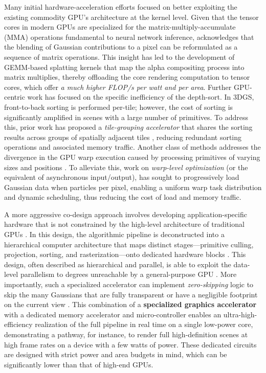 \documentclass[11pt,a4paper]{article}
\begin{document}
Many initial hardware-acceleration efforts focused on better exploiting the existing commodity GPU's architecture at the kernel level. Given that the tensor cores in modern GPUs are specialized for the matrix-multiply-accumulate (MMA) operations fundamental to neural network inference, \cite{arxiv:2308.04079v1} acknowledges that the blending of Gaussian contributions to a pixel can be reformulated as a sequence of matrix operations. This insight has led to the development of GEMM-based splatting kernels that map the alpha compositing process into matrix multiplies, thereby offloading the core rendering computation to tensor cores, which offer \emph{a much higher FLOP/s per watt and per area}. Further GPU-centric work has focused on the specific inefficiency of the depth-sort. In 3DGS, front-to-back sorting is performed per-tile; however, the cost of sorting is significantly amplified in scenes with a large number of primitives. To address this, prior work has proposed a \emph{tile-grouping accelerator} that shares the sorting results across groups of spatially adjacent tiles \cite{arxiv:2308.04079v1}, reducing redundant sorting operations and associated memory traffic. Another class of methods addresses the divergence in the GPU warp execution caused by processing primitives of varying sizes and positions \cite{arxiv:2401.03890v2}. To alleviate this, work on \emph{warp-level optimization} (or the equivalent of asynchronous input/output), has sought to progressively load Gaussian data when particles per pixel, enabling a uniform warp task distribution and dynamic scheduling, thus reducing the cost of load and memory traffic.

A more aggressive co-design approach involves developing application-specific hardware that is not constrained by the high-level architecture of traditional GPUs \cite{arxiv:2401.03890v2}. In this design, the algorithmic pipeline is deconstructed into a hierarchical computer architecture that maps distinct stages---primitive culling, projection, sorting, and rasterization---onto dedicated hardware blocks \cite{arxiv:2401.03890v2}. This design, often described as hierarchical and parallel, is able to exploit the data-level parallelism to degrees unreachable by a general-purpose GPU \cite{arxiv:2401.03890v2}. More importantly, such a specialized accelerator can implement \emph{zero-skipping} logic to skip the many Gaussians that are fully transparent or have a negligible footprint on the current view \cite{arxiv:2401.03890v2}. This combination of a \textbf{specialized graphics accelerator} with a dedicated memory accelerator and micro-controller enables an ultra-high-efficiency realization of the full pipeline in real time on a single low-power core, demonstrating a pathway, for instance, to render full high-definition scenes at high frame rates on a device with a few watts of power. These dedicated circuits are designed with strict power and area budgets in mind, which can be significantly lower than that of high-end GPUs.
\end{document}
